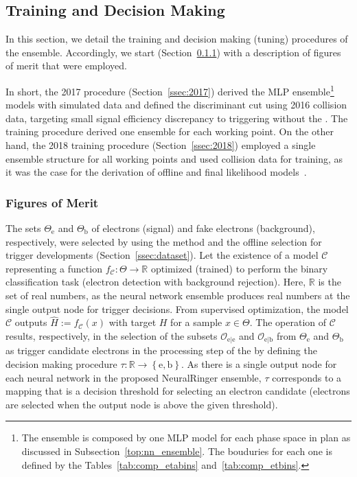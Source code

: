 \subsection{Training and Decision Making}%
\label{sec:tuning}

In this section, we detail the training and decision making (tuning) procedures
of the \rnn ensemble. Accordingly, we start (Section~\ref{ssec:fom}) with a
description of figures of merit that were employed.

In short, the 2017 procedure (Section~\ref{ssec:2017}) derived the MLP ensemble\footnote{
  The ensemble is composed by one MLP model for each phase space in plan \eteta as discussed 
  in Subsection~\ref{top:nn_ensemble}. The bouduries for each one is defined by the 
  Tables~\ref{tab:comp_etabins} and~\ref{tab:comp_etbins}.} 
models with simulated data and defined the discriminant cut using
2016 collision data, targeting small signal efficiency discrepancy to triggering 
without the \rnn. The training procedure derived one ensemble for each working
point. On the other hand, the 2018 training procedure (Section~\ref{ssec:2018})
employed a single ensemble structure for all working points and used
collision data for training, as it was the case for the derivation of offline
and final \hlt likelihood models~\cite{aaboud2019electron}.

\subsubsection{Figures of Merit}\label{ssec:fom}



The sets $\Theta_{\text{e}}$ and $\Theta_{\text{b}}$ of electrons (signal) and fake electrons (background), respectively, were selected by using the \tnp{} method and the offline selection for trigger developments (Section~\ref{ssec:dataset}). Let the existence of a model $\mathcal{C}$ representing a function $f_{\mathcal{C}} : \Theta \rightarrow \mathbb{R}$ optimized (trained) to perform the binary classification task (electron detection with background rejection). Here, $\mathbb{R}$ is the set of real numbers, as the neural network ensemble produces real numbers at the single output node for trigger decisions.  From supervised optimization, the model $\mathcal{C}$ outputs $\hat{H}:=f_{\mathcal{C}}(x)$ with target $H$ for a sample $x \in \Theta$. The operation of $\mathcal{C}$ results, respectively, in the selection of the subsets $\mathcal{O}_{\text{e}|\text{e}}$ and $\mathcal{O}_{\text{e}|\text{b}}$ from $\Theta_{\text{e}}$ and $\Theta_{\text{b}}$ as trigger candidate electrons in the \fastcalo{} processing step of the \hlt{} by defining the decision making procedure $\tau : \mathbb{R} \rightarrow \left\{\text{e},\text{b}\right\}$. As there is a single output node for each neural network in the proposed NeuralRinger ensemble, $\tau$ corresponds to a mapping that is a decision threshold for selecting an electron candidate (electrons are selected when the output node is above the given threshold).  


